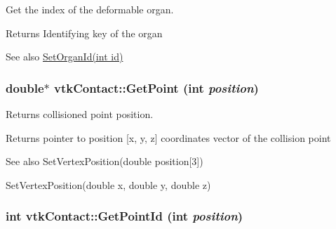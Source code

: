 Get the index of the deformable organ. \begin{DoxyReturn}{Returns}
Identifying key of the organ 
\end{DoxyReturn}
\begin{DoxySeeAlso}{See also}
\hyperlink{classvtkContact_aeb38ed699e47ceb31df529db0ea8458f}{SetOrganId(int id)} 
\end{DoxySeeAlso}
\hypertarget{classvtkContact_a03931eb9be6db9e78e5228d7bc37996f}{
\subsubsection[{GetPoint}]{\setlength{\rightskip}{0pt plus 5cm}double$\ast$ vtkContact::GetPoint (int {\em position})}}
\label{classvtkContact_a03931eb9be6db9e78e5228d7bc37996f}


Returns collisioned point position. \begin{DoxyReturn}{Returns}
pointer to position \mbox{[}x, y, z\mbox{]} coordinates vector of the collision point 
\end{DoxyReturn}
\begin{DoxySeeAlso}{See also}
SetVertexPosition(double position\mbox{[}3\mbox{]}) 

SetVertexPosition(double x, double y, double z) 
\end{DoxySeeAlso}
\hypertarget{classvtkContact_a4b404cb999cbe287f2ea6c386e34d0fd}{
\subsubsection[{GetPointId}]{\setlength{\rightskip}{0pt plus 5cm}int vtkContact::GetPointId (int {\em position})}}
\label{classvtkContact_a4b404cb999cbe287f2ea6c386e34d0fd}


